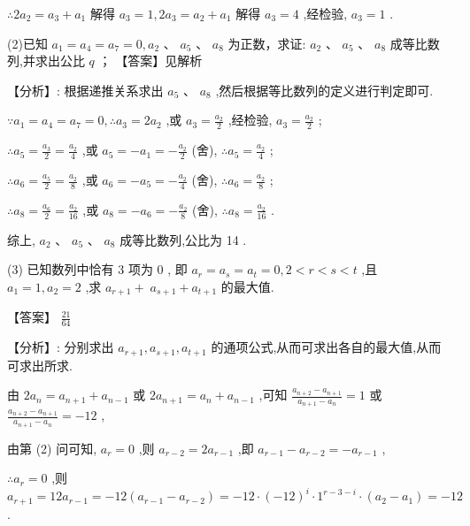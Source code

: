 \documentclass[10pt]{article}
\begin{document}
\(\therefore 2{a}_{2} = {a}_{3} + {a}_{1}\) 解得 \({a}_{3} = 1,2{a}_{3} = {a}_{2} + {a}_{1}\) 解得 \({a}_{3} = 4\) ,经检验, \({a}_{3} = 1\) .

(2)已知 \({a}_{1} = {a}_{4} = {a}_{7} = 0,{a}_{2}\text{ 、 }{a}_{5}\text{ 、 }{a}_{8}\) 为正数，求证: \({a}_{2}\text{ 、 }{a}_{5}\text{ 、 }{a}_{8}\) 成等比数列,并求出公比 \(q\) ； 【答案】见解析

【分析】: 根据递推关系求出 \({a}_{5}\text{ 、 }{a}_{8}\) ,然后根据等比数列的定义进行判定即可.

\(\because {a}_{1} = {a}_{4} = {a}_{7} = 0,\therefore {a}_{3} = 2{a}_{2}\) ,或 \({a}_{3} = \frac{{a}_{2}}{2}\) ,经检验, \({a}_{3} = \frac{{a}_{2}}{2}\) ;

\(\therefore {a}_{5} = \frac{{a}_{3}}{2} = \frac{{a}_{2}}{4}\) ,或 \({a}_{5} =  - {a}_{1} =  - \frac{{a}_{2}}{2}\) (舍), \(\therefore {a}_{5} = \frac{{a}_{2}}{4}\) ;

\(\therefore {a}_{6} = \frac{{a}_{5}}{2} = \frac{{a}_{2}}{8}\) ,或 \({a}_{6} =  - {a}_{5} =  - \frac{{a}_{2}}{4}\) (舍), \(\therefore {a}_{6} = \frac{{a}_{2}}{8}\) ;

\(\therefore {a}_{8} = \frac{{a}_{6}}{2} = \frac{{a}_{2}}{16}\) ,或 \({a}_{8} =  - {a}_{6} =  - \frac{{a}_{2}}{8}\) (舍), \(\therefore {a}_{8} = \frac{{a}_{2}}{16}\) .

综上, \({a}_{2}\text{ 、 }{a}_{5}\text{ 、 }{a}_{8}\) 成等比数列,公比为 14 .

(3) 已知数列中恰有 3 项为 0 , 即 \({a}_{r} = {a}_{s} = {a}_{t} = 0,2 < r < s < t\) ,且 \({a}_{1} = 1,{a}_{2} = 2\) ,求 \({a}_{r + 1} + \; {a}_{s + 1} + {a}_{t + 1}\) 的最大值.

【答案】 \(\frac{21}{64}\)

【分析】: 分别求出 \({a}_{r + 1},{a}_{s + 1},{a}_{t + 1}\) 的通项公式,从而可求出各自的最大值,从而可求出所求.

由 \(2{a}_{n} = {a}_{n + 1} + {a}_{n - 1}\) 或 \(2{a}_{n + 1} = {a}_{n} + {a}_{n - 1}\) ,可知 \(\frac{{a}_{n + 2} - {a}_{n + 1}}{{a}_{n + 1} - {a}_{n}} = 1\) 或 \(\frac{{a}_{n + 2} - {a}_{n + 1}}{{a}_{n + 1} - {a}_{n}} =  - {12}\) ,

由第 (2) 问可知, \({a}_{r} = 0\) ,则 \({a}_{r - 2} = 2{a}_{r - 1}\) ,即 \({a}_{r - 1} - {a}_{r - 2} =  - {a}_{r - 1}\) ,

\(\therefore {a}_{r} = 0\) ,则 \({a}_{r + 1} = {12}{a}_{r - 1} =  - {12}\left( {{a}_{r - 1} - {a}_{r - 2}}\right)  =  - {12} \cdot  {\left( -{12}\right) }^{i} \cdot  {1}^{r - 3 - i} \cdot  \left( {{a}_{2} - {a}_{1}}\right)  =  - {12}\) .
\end{document}
